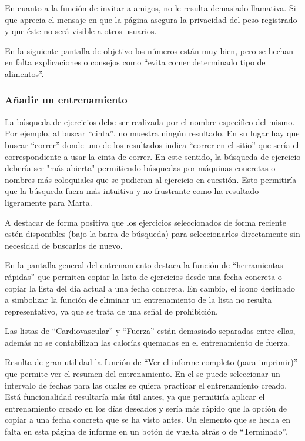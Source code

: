 \documentclass[a4paper]{article}
\begin{document}
			En cuanto a la función de invitar a amigos, no le resulta demasiado llamativa. Si que aprecia el mensaje en que la página asegura la privacidad del peso registrado y que éste no será visible a otros usuarios.
			
			En la siguiente pantalla de objetivo los números están muy bien, pero se hechan en falta explicaciones o consejos como ``evita comer determinado tipo de alimentos''.
			
			\subsubsection*{Añadir un entrenamiento}
			
			La búsqueda de ejercicios debe ser realizada por el nombre específico del mismo. Por ejemplo, al buscar ``cinta'', no muestra ningún resultado. En su lugar hay que buscar ``correr'' donde uno de los resultados indica ``correr en el sitio'' que sería el correspondiente a usar la cinta de correr. En este sentido, la búsqueda de ejercicio debería ser "más abierta" permitiendo búsquedas por máquinas concretas o nombres más coloquiales que se pudieran al ejercicio en cuestión. Esto permitiría que la búsqueda fuera más intuitiva y no frustrante como ha resultado ligeramente para Marta.
			
			A destacar de forma positiva que los ejercicios seleccionados de forma reciente estén disponibles (bajo la barra de búsqueda) para seleccionarlos directamente sin necesidad de buscarlos de nuevo.
			
			En la pantalla general del entrenamiento destaca la función de ``herramientas rápidas'' que permiten copiar la lista de ejercicios desde una fecha concreta o copiar la lista del día actual a una fecha concreta. En cambio, el icono destinado a simbolizar la función de eliminar un entrenamiento de la lista no resulta representativo, ya que se trata de una señal de prohibición.
			
			Las listas de ``Cardiovascular'' y ``Fuerza'' están demasiado separadas entre ellas, además no se contabilizan las calorías quemadas en el entrenamiento de fuerza.
			
			Resulta de gran utilidad la función de ``Ver el informe completo (para imprimir)'' que permite ver el resumen del entrenamiento. En el se puede seleccionar un intervalo de fechas para las cuales se quiera practicar el entrenamiento creado. Está funcionalidad resultaría más útil antes, ya que permitiría aplicar el entrenamiento creado en los días deseados y sería más rápido que la opción de copiar a una fecha concreta que se ha visto antes. Un elemento que se hecha en falta en esta página de informe en un botón de vuelta atrás o de ``Terminado''.
			
\end{document}
